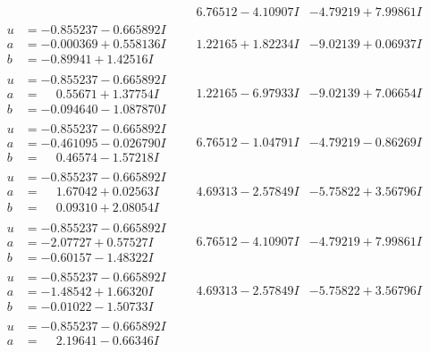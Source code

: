 \documentclass[1p]{elsarticle_modified}
\theoremstyle{definition}
\begin{document}
$$\begin{array}{c|c|c}
 & \phantom{-}6.76512 - 4.10907 I & -4.79219 + 7.99861 I \\ \hline\begin{aligned}
u &= -0.855237 - 0.665892 I \\
a &= -0.000369 + 0.558136 I \\
b &= -0.89941 + 1.42516 I\end{aligned}
 & \phantom{-}1.22165 + 1.82234 I & -9.02139 + 0.06937 I \\ \hline\begin{aligned}
u &= -0.855237 - 0.665892 I \\
a &= \phantom{-}0.55671 + 1.37754 I \\
b &= -0.094640 - 1.087870 I\end{aligned}
 & \phantom{-}1.22165 - 6.97933 I & -9.02139 + 7.06654 I \\ \hline\begin{aligned}
u &= -0.855237 - 0.665892 I \\
a &= -0.461095 - 0.026790 I \\
b &= \phantom{-}0.46574 - 1.57218 I\end{aligned}
 & \phantom{-}6.76512 - 1.04791 I & -4.79219 - 0.86269 I \\ \hline\begin{aligned}
u &= -0.855237 - 0.665892 I \\
a &= \phantom{-}1.67042 + 0.02563 I \\
b &= \phantom{-}0.09310 + 2.08054 I\end{aligned}
 & \phantom{-}4.69313 - 2.57849 I & -5.75822 + 3.56796 I \\ \hline\begin{aligned}
u &= -0.855237 - 0.665892 I \\
a &= -2.07727 + 0.57527 I \\
b &= -0.60157 - 1.48322 I\end{aligned}
 & \phantom{-}6.76512 - 4.10907 I & -4.79219 + 7.99861 I \\ \hline\begin{aligned}
u &= -0.855237 - 0.665892 I \\
a &= -1.48542 + 1.66320 I \\
b &= -0.01022 - 1.50733 I\end{aligned}
 & \phantom{-}4.69313 - 2.57849 I & -5.75822 + 3.56796 I \\ \hline\begin{aligned}
u &= -0.855237 - 0.665892 I \\
a &= \phantom{-}2.19641 - 0.66346 I \\

\end{aligned}
\end{array}$$
\end{document}
